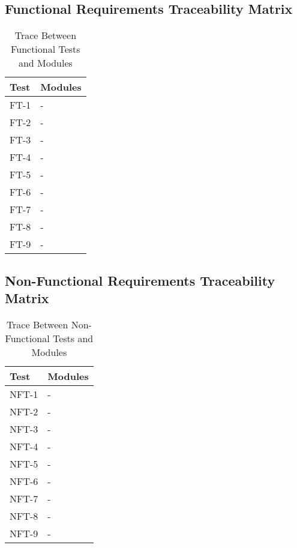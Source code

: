 \documentclass[12pt, titlepage]{article}
\begin{document}
\subsection{Functional Requirements Traceability Matrix}
\begin{table}[H]
\centering
\begin{tabular}{p{} p{}}
\toprule
\textbf{Test} & \textbf{Modules}\\
\midrule
FT-1 & -\\
FT-2 & -\\
FT-3 & -\\
FT-4 & -\\
FT-5 & -\\
FT-6 & -\\
FT-7 & -\\
FT-8 & -\\
FT-9 & -\\
\bottomrule
\end{tabular}
\caption{Trace Between Functional Tests and Modules}
\label{TblFTM}
\end{table}

\newpage

\subsection{Non-Functional Requirements Traceability Matrix}
\begin{table}[H]
\centering
\begin{tabular}{p{} p{}}
\toprule
\textbf{Test} & \textbf{Modules}\\
\midrule
NFT-1 & -\\
NFT-2 & -\\
NFT-3 & -\\
NFT-4 & -\\
NFT-5 & -\\
NFT-6 & -\\
NFT-7 & -\\
NFT-8 & -\\
NFT-9 & -\\
\bottomrule
\end{tabular}
\caption{Trace Between Non-Functional Tests and Modules}
\label{TblNFTM}
\end{table}

\newpage
\end{document}
